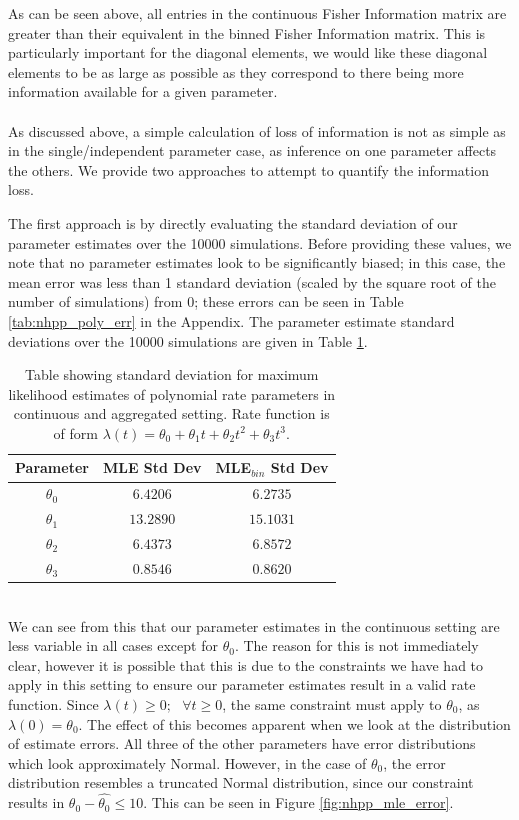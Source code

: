 \documentclass[11pt,a4,twosided,singlespacing,titlepagenumber=on,numbers=endperiod]{scrreprt}
\numberwithin{equation}{chapter} %
\theoremstyle{remark}
\begin{document}
As can be seen above, all entries in the continuous Fisher Information matrix are greater than their equivalent in the binned Fisher Information matrix. This is particularly important for the diagonal elements, we would like these diagonal elements to be as large as possible as they correspond to there being more information available for a given parameter. \\\\
As discussed above, a simple calculation of loss of information is not as simple as in the single/independent parameter case, as inference on one parameter affects the others. We provide two approaches to attempt to quantify the information loss.

The first approach is by directly evaluating the standard deviation of our parameter estimates over the 10000 simulations. Before providing these values, we note that no parameter estimates look to be significantly biased; in this case, the mean error was less than 1 standard deviation (scaled by the square root of the number of simulations) from 0; these errors can be seen in Table \ref{tab:nhpp_poly_err} in the Appendix. The parameter estimate standard deviations over the 10000 simulations are given in Table \ref{tab:nhpp_poly_std_dev}.
\begin{table}[ht]
	\centering
	\begin{tabular}{|c|c|c|}
	\hline
		Parameter & MLE Std Dev & MLE$_{bin}$ Std Dev\\
	\hline
		$\theta_0$ & $6.4206$ & $6.2735$ \\
	\hline
		$\theta_1$  & $13.2890$ & $15.1031$ \\
	\hline
		$\theta_2$  & $6.4373$ & $6.8572$ \\
	\hline
		$\theta_3$  & $0.8546$ & $0.8620$ \\
	\hline
	\end{tabular}
	\caption{Table showing standard deviation for maximum likelihood estimates of polynomial rate parameters in continuous and aggregated setting. Rate function is of form $\lambda(t) = \theta_0 + \theta_1 t + \theta_2 t^2 + \theta_3 t^3.$}
	\label{tab:nhpp_poly_std_dev}
\end{table}\\
We can see from this that our parameter estimates in the continuous setting are less variable in all cases except for $\theta_0$. The reason for this is not immediately clear, however it is possible that this is due to the constraints we have had to apply in this setting to ensure our parameter estimates result in a valid rate function. Since $\lambda(t) \geq 0; \text{ } \forall t \geq 0$, the same constraint must apply to $\theta_0$, as $\lambda(0) = \theta_0$. The effect of this becomes apparent when we look at the distribution of estimate errors. All three of the other parameters have error distributions which look approximately Normal. However, in the case of $\theta_0$, the error distribution resembles a truncated Normal distribution, since our constraint results in $\theta_0 - \hat{\theta_0} \leq 10$. This can be seen in Figure \ref{fig:nhpp_mle_error}.
\end{document}
